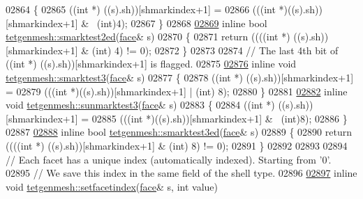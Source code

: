 \begin{DoxyCode}
02864 \{
02865   ((\textcolor{keywordtype}{int} *) ((s).sh))[shmarkindex+1] = 
02866     (((\textcolor{keywordtype}{int} *)((s).sh))[shmarkindex+1] & ~(int)4);
02867 \}
02868 
\hypertarget{tetgen_8h_source.tex_l02869}{}\hyperlink{classtetgenmesh_af0763e190de4c7e562a697ef70b07f49}{02869} \textcolor{keyword}{inline} \textcolor{keywordtype}{bool} \hyperlink{classtetgenmesh_af0763e190de4c7e562a697ef70b07f49}{tetgenmesh::smarktest2ed}(\hyperlink{classtetgenmesh_1_1face}{face}& s) 
02870 \{
02871   \textcolor{keywordflow}{return} ((((\textcolor{keywordtype}{int} *) ((s).sh))[shmarkindex+1] & (\textcolor{keywordtype}{int}) 4) != 0);
02872 \}
02873 
02874 \textcolor{comment}{// The last 4th bit of ((int *) ((s).sh))[shmarkindex+1] is flagged.}
02875 
\hypertarget{tetgen_8h_source.tex_l02876}{}\hyperlink{classtetgenmesh_a911624f2fd1f32f532ee7e6ac93e2f11}{02876} \textcolor{keyword}{inline} \textcolor{keywordtype}{void} \hyperlink{classtetgenmesh_a911624f2fd1f32f532ee7e6ac93e2f11}{tetgenmesh::smarktest3}(\hyperlink{classtetgenmesh_1_1face}{face}& s) 
02877 \{
02878   ((\textcolor{keywordtype}{int} *) ((s).sh))[shmarkindex+1] = 
02879     (((\textcolor{keywordtype}{int} *)((s).sh))[shmarkindex+1] | (int) 8);
02880 \}
02881 
\hypertarget{tetgen_8h_source.tex_l02882}{}\hyperlink{classtetgenmesh_ad54453eed153d535778b54e16ec0e7a7}{02882} \textcolor{keyword}{inline} \textcolor{keywordtype}{void} \hyperlink{classtetgenmesh_ad54453eed153d535778b54e16ec0e7a7}{tetgenmesh::sunmarktest3}(\hyperlink{classtetgenmesh_1_1face}{face}& s) 
02883 \{
02884   ((\textcolor{keywordtype}{int} *) ((s).sh))[shmarkindex+1] = 
02885     (((\textcolor{keywordtype}{int} *)((s).sh))[shmarkindex+1] & ~(int)8);
02886 \}
02887 
\hypertarget{tetgen_8h_source.tex_l02888}{}\hyperlink{classtetgenmesh_ade28af838e064f4fc60716d8ca2402f6}{02888} \textcolor{keyword}{inline} \textcolor{keywordtype}{bool} \hyperlink{classtetgenmesh_ade28af838e064f4fc60716d8ca2402f6}{tetgenmesh::smarktest3ed}(\hyperlink{classtetgenmesh_1_1face}{face}& s) 
02889 \{
02890   \textcolor{keywordflow}{return} ((((\textcolor{keywordtype}{int} *) ((s).sh))[shmarkindex+1] & (\textcolor{keywordtype}{int}) 8) != 0);
02891 \}
02892 
02893 
02894 \textcolor{comment}{// Each facet has a unique index (automatically indexed). Starting from '0'.}
02895 \textcolor{comment}{// We save this index in the same field of the shell type. }
02896 
\hypertarget{tetgen_8h_source.tex_l02897}{}\hyperlink{classtetgenmesh_ada5d50fbd8ccc1c82389b0b3450ce98e}{02897} \textcolor{keyword}{inline} \textcolor{keywordtype}{void} \hyperlink{classtetgenmesh_ada5d50fbd8ccc1c82389b0b3450ce98e}{tetgenmesh::setfacetindex}(\hyperlink{classtetgenmesh_1_1face}{face}& s, \textcolor{keywordtype}{int} value)

\end{DoxyCode}
